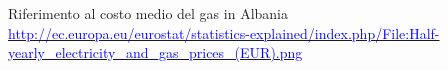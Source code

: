\begin{thebibliography}{99}
 Riferimento al costo medio del gas in Albania\newline 
			\href{http://ec.europa.eu/eurostat/statistics-explained/index.php/File:Half-yearly\_electricity\_and\_gas\_prices\_(EUR).png}{\textcolor{blue}{http://ec.europa.eu/eurostat/statistics-explained/index.php/File:Half-yearly\_electricity\_and\_gas\_prices\_(EUR).png}}


		
\end{thebibliography}